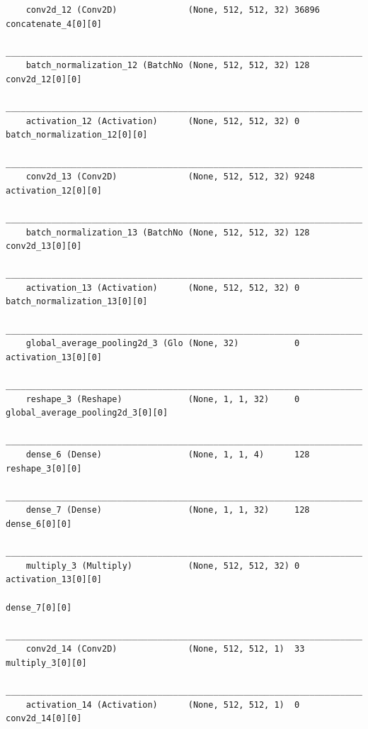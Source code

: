 {\begin{verbatim}
    conv2d_12 (Conv2D)              (None, 512, 512, 32) 36896       concatenate_4[0][0]              
    __________________________________________________________________________________________________
    batch_normalization_12 (BatchNo (None, 512, 512, 32) 128         conv2d_12[0][0]                  
    __________________________________________________________________________________________________
    activation_12 (Activation)      (None, 512, 512, 32) 0           batch_normalization_12[0][0]     
    __________________________________________________________________________________________________
    conv2d_13 (Conv2D)              (None, 512, 512, 32) 9248        activation_12[0][0]              
    __________________________________________________________________________________________________
    batch_normalization_13 (BatchNo (None, 512, 512, 32) 128         conv2d_13[0][0]                  
    __________________________________________________________________________________________________
    activation_13 (Activation)      (None, 512, 512, 32) 0           batch_normalization_13[0][0]     
    __________________________________________________________________________________________________
    global_average_pooling2d_3 (Glo (None, 32)           0           activation_13[0][0]              
    __________________________________________________________________________________________________
    reshape_3 (Reshape)             (None, 1, 1, 32)     0           global_average_pooling2d_3[0][0] 
    __________________________________________________________________________________________________
    dense_6 (Dense)                 (None, 1, 1, 4)      128         reshape_3[0][0]                  
    __________________________________________________________________________________________________
    dense_7 (Dense)                 (None, 1, 1, 32)     128         dense_6[0][0]                    
    __________________________________________________________________________________________________
    multiply_3 (Multiply)           (None, 512, 512, 32) 0           activation_13[0][0]              
                                                                        dense_7[0][0]                    
    __________________________________________________________________________________________________
    conv2d_14 (Conv2D)              (None, 512, 512, 1)  33          multiply_3[0][0]                 
    __________________________________________________________________________________________________
    activation_14 (Activation)      (None, 512, 512, 1)  0           conv2d_14[0][0]                  

\end{verbatim}}
